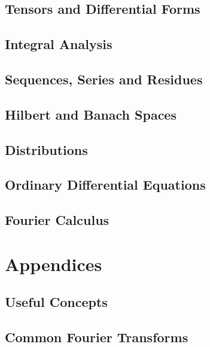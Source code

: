 \documentclass{book}
\theoremstyle{definition}
\theoremstyle{remark}
\newcommand{\1}{\ensuremath{\mathds{1}}}
\begin{document}
\chapter{Tensors and Differential Forms}

\chapter{Integral Analysis} %

\chapter{Sequences, Series and Residues}

\chapter{Hilbert and Banach Spaces} %

\chapter{Distributions}

\chapter{Ordinary Differential Equations}

\chapter{Fourier Calculus}

\part*{Appendices}
\appendix
\chapter{Useful Concepts}

\chapter{Common Fourier Transforms}

%
%
%
\nocite{manifoldcalc,lanzara,complessa,funzionalecesi}
\printbibliography
\end{document}
